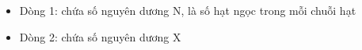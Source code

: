 \begin{itemize}
	\item     Dòng 1: chứa số nguyên dương N, là số hạt ngọc trong mỗi chuỗi hạt   
	\item     Dòng 2: chứa số nguyên dương X   
\end{itemize}